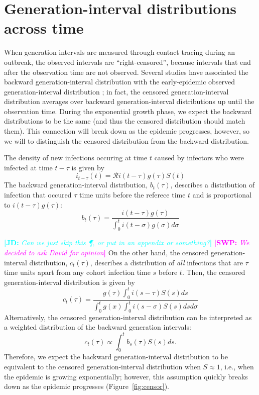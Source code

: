 \documentclass[12pt]{article}
\newcommand{\RR}{\ensuremath{{\mathcal R}}}
\newcommand{\comment}[3]{\textcolor{#1}{\textbf{[#2: }\textsl{#3}\textbf{]}}}
\newcommand{\jd}[1]{\comment{cyan}{JD}{#1}}
\newcommand{\swp}[1]{\comment{magenta}{SWP}{#1}}
\begin{document}
\section{Generation-interval distributions across time}

When generation intervals are measured through contact tracing during an outbreak, 
the observed intervals are ``right-censored'', because intervals that end after the observation time are not observed.
Several studies have associated the backward generation-interval distribution with the early-epidemic observed generation-interval distribution \citep{tomba2010some, nishiura2010time, champredon2015intrinsic, britton2019estimation};
in fact, the censored generation-interval distribution averages over backward generation-interval distributions up until the observation time.
During the exponential growth phase, we expect the backward distributions to be the same (and thus the censored distribution should match them).
This connection will break down as the epidemic progresses, however, so we will to distinguish the censored distribution from the backward distribution.

The density of new infections occuring at time $t$ caused by infectors who were infected at time $t-\tau$ is given by
\begin{equation}
i_{t-\tau}(t) = \RR i(t-\tau) g(\tau) S(t)
\end{equation}
The backward generation-interval distribution, $b_t(\tau)$, describes a distribution of infection that occured $\tau$ time units before the referece time $t$ and is proportional to $i(t-\tau) g(\tau)$:
\begin{equation}
b_t(\tau) = \frac{i(t-\tau) g(\tau)}{\int_0^t i(t-\sigma) g(\sigma) d\sigma}
\end{equation}

\jd{Can we just skip this \P, or put in an appendix or something?}
\swp{We decided to ask David for opinion}
On the other hand, the censored generation-interval distribution, $c_t(\tau)$, describes a distribution of \emph{all} infections that are $\tau$ time units apart from any cohort infection time $s$ before $t$.
Then, the censored generation-interval distribution is given by
\begin{equation}\label{eq:obsg}
c_t(\tau) = \frac{g(\tau) \int_0^t i(s-\tau) S(s) ds}{\int_0^t g(x) \int_0^t i(s-\sigma) S(s) ds d\sigma}
\end{equation}
Alternatively, the censored generation-interval distribution can be interpreted as a weighted distribution of the backward generation intervals:
\begin{equation}
c_t(\tau) \propto \int_0^t b_s(\tau) S(s) ds.
\end{equation}
Therefore, we expect the backward generation-interval distribution to be equivalent to the censored generation-interval distribution when $S \approx 1$, i.e., when the epidemic is growing exponentially;
however, this assumption quickly breaks down as the epidemic progresses (Figure~\ref{fig:censor}).
\end{document}
